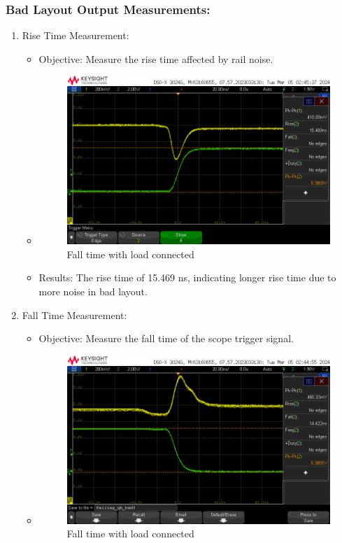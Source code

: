\documentclass[a4paper,11pt]{article}%
\begin{document}
\subsubsection{Bad Layout Output Measurements:}

\begin{enumerate}
	\item 
	Rise Time Measurement:
	\begin{itemize}
		\item Objective: Measure the rise time affected by rail noise.
		\item 
		\begin{figure}[H]
			\centering
			\includegraphics[scale=0.6]{figures/bad/quite_high/rise/rising_qh_bad4.png}
			\caption{Fall time with load connected}
		\end{figure}
		\item Results: The rise time of 15.469 ns, indicating longer rise time due to more noise in bad layout.
	\end{itemize}
	
	\item Fall Time Measurement:
	\begin{itemize}
		\item Objective: Measure the fall time of the scope trigger signal.
		\item 
		\begin{figure}[H]
			\centering
			\includegraphics[scale=0.6]{figures/bad/quite_high/fall/falling_qh_bad3.png}
			\caption{Fall time with load connected}
		\end{figure}
		

\end{itemize}
\end{enumerate}
\end{document}
